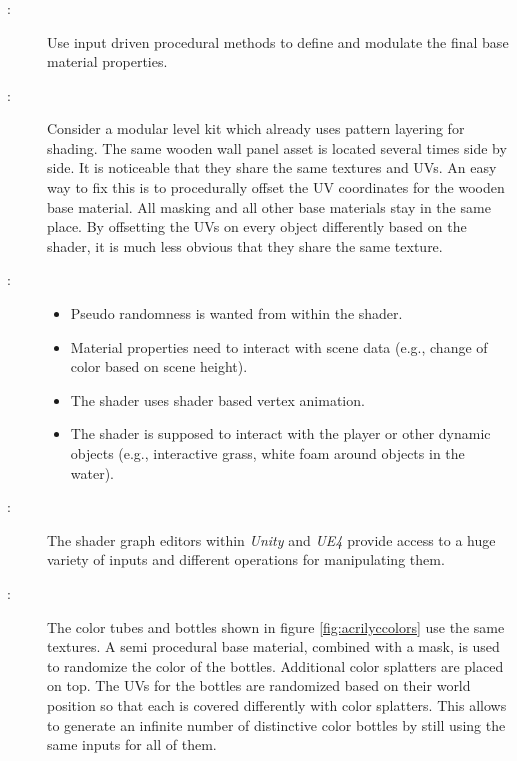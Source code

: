 \subsubsection{\patCreationProcedural}\label{\patCreationProcedural}
\begin{description}
	\item[\patIntent:]%
	Use input driven procedural methods to define and modulate the final base material properties.
	\item[\patMotivation:]%
	Consider a modular level kit which already uses pattern layering for shading. The same wooden wall panel asset is located several times side by side. It is noticeable that they share the same textures and UVs. An easy way to fix this is to procedurally offset the UV coordinates for the wooden base material. All masking and all other base materials stay in the same place. By offsetting the UVs on every object differently based on the shader, it is much less obvious that they share the same texture.  
	\item[\patApplicability:]\hfill 
	\begin{itemize}\mynobreakpar
		\item Pseudo randomness is wanted from within the shader. 
		\item Material properties need to interact with scene data (e.g., change of color based on scene height).
		\item The shader uses shader based vertex animation. 
		\item The shader is supposed to interact with the player or other dynamic objects (e.g., interactive grass, white foam around objects in the water).			
	\end{itemize}
	\item[\patImplementation:]%
	The shader graph editors within \emph{Unity} and \emph{UE4} provide access to a huge variety of inputs and different operations for manipulating them. 
	\item[\patExamples:]%
	The color tubes and bottles shown in figure \ref{fig:acrilyccolors} use the same textures. A semi procedural base material, combined with a mask, is used to randomize the color of the bottles. Additional color splatters are placed on top. The UVs for the bottles are randomized based on their world position so that each is covered differently with color splatters. This allows to generate an infinite number of distinctive color bottles by still using the same inputs for all of them. 

\end{description}
